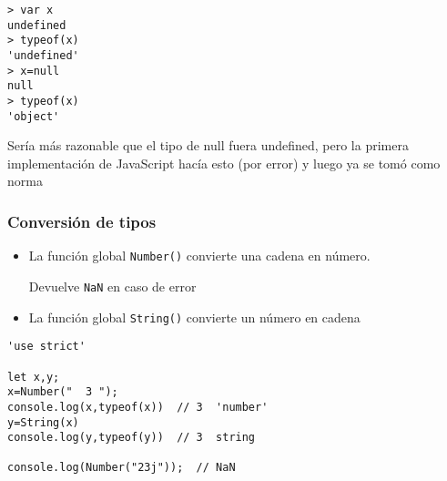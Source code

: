 \documentclass[ucs]{beamer}
\begin{document}
\begin{frame}[fragile]



  \begin{scriptsize}
  \begin{verbatim}
> var x
undefined
> typeof(x)
'undefined'
> x=null
null
> typeof(x)
'object'
  \end{verbatim}
  \end{scriptsize}


Sería más razonable que el tipo de null fuera undefined, pero la
primera implementación de JavaScript hacía esto (por error) y luego ya se
tomó como norma

\end{frame}

\begin{frame}[fragile]
\frametitle{Conversión de tipos}
\begin{itemize}
\item
La función global
\verb|Number()|
convierte una cadena en número.

Devuelve \verb|NaN| en caso de error
\item
La función global
\verb|String()|
convierte un número en cadena
\end{itemize}

  \begin{scriptsize}
  \begin{verbatim}
'use strict'

let x,y;
x=Number("  3 ");
console.log(x,typeof(x))  // 3  'number'
y=String(x)
console.log(y,typeof(y))  // 3  string

console.log(Number("23j"));  // NaN
  \end{verbatim}
  \end{scriptsize}
\end{frame}
\end{document}
